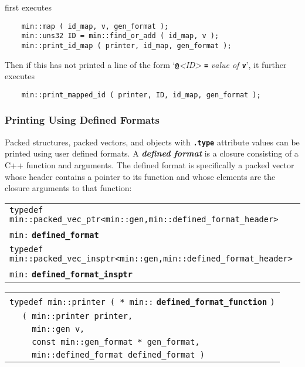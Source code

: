 \documentclass[12pt]{article}
\makeatletter
\newcommand{\TT}[1]{{\tt \bfseries #1}}
\newcommand{\key}[1]{{\bf \em #1}\index{#1}}
\newcommand{\ttindex}[1]{\index{#1@{\tt #1}}}
\newenvironment{indpar}[1][0.3in]%
	{\begin{list}{}%
		     {\setlength{\itemsep}{0in}%
		      \setlength{\topsep}{0in}%
		      \setlength{\parsep}{1ex}%
		      \setlength{\labelwidth}{#1}%
		      \setlength{\leftmargin}{#1}%
		      \addtolength{\leftmargin}{\labelsep}}%
	 \item}%
	{\end{list}}
\newcommand{\LABEL}[1]{\label{#1}}
\newlength{\ARGBREAKLENGTH}
\newcommand{\ARGBREAK}[1][\ARGBREAKLENGTH]{\\&\hspace*{#1}}
\newcommand{\MINKEY}[1]%
	   {\TT{#1}\ttindex{min::#1}\ttindex{#1}}
\makeatother
\begin{document}
first executes

\begin{indpar}\begin{verbatim}
    min::map ( id_map, v, gen_format );
    min::uns32 ID = min::find_or_add ( id_map, v );
    min::print_id_map ( printer, id_map, gen_format );
\end{verbatim}\end{indpar}

Then if this has not printed a line of the form
`\TT{@}{\em <ID>} \TT{=} {\em value of \TT{v}}', it further
executes

\begin{indpar}\begin{verbatim}
    min::print_mapped_id ( printer, ID, id_map, gen_format );
\end{verbatim}\end{indpar}

\subsubsection{Printing Using Defined Formats}
\label{PRINTING-USING-DEFINED-FORMATS}

Packed structures, packed vectors, and objects with
\TT{.type} attribute values can be printed using user defined
formats.  A \key{defined format} is a closure consisting of
a C++ function and arguments.  The defined format is specifically
a packed vector whose header contains a pointer to its function
and whose elements are the closure arguments to that function:

\begin{indpar}[0.1in]\begin{tabular}{l}
\verb|typedef min::packed_vec_ptr<min::gen,min::defined_format_header>|\\
\hspace*{1in}\verb|min:| \MINKEY{defined\_format} \\
\verb|typedef min::packed_vec_insptr<min::gen,min::defined_format_header>|\\
\hspace*{1in}\verb|min:| \MINKEY{defined\_format\_insptr} \\
\end{tabular}\end{indpar}

\begin{indpar}[0.1in]\begin{tabular}{r@{}l}
\multicolumn{2}{l}{{\tt typedef min::printer ( * min::}
		\MINKEY{defined\_format\_function} {\tt )} }
\LABEL{MIN::DEFINED_FORMAT_FUNCTION}\ARGBREAK[0.5in]
      \verb|( min::printer printer,|\ARGBREAK[0.5in]
      \verb|  min::gen v,|\ARGBREAK[0.5in]
      \verb|  const min::gen_format * gen_format,|\ARGBREAK[0.5in]
      \verb|  min::defined_format defined_format )|
\end{tabular}\end{indpar}
\end{document}
